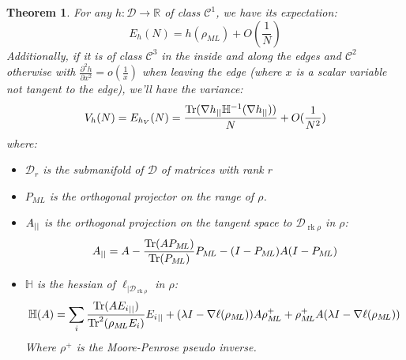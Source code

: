 \documentclass[10pt,a4paper]{report}
\theoremstyle{plain}
\newtheorem{thm}{Theorem}[chapter]
\theoremstyle{definition}
\theoremstyle{remark}
\newcommand{\R}{\ensuremath{\mathbb{R}}}
\newcommand{\dparn}[3]{\frac{\partial^{#3} {#1}}{\partial{#2}^{#3}}}
\DeclareMathOperator{\Tr}{Tr}
\DeclareMathOperator{\rk}{rk}
\newcommand{\class}[1]{{\mathscr{C}^{#1}}}
\newcommand{\ml}{_{M\!L}}
\begin{document}
\begin{thm}\label{thm:asymain}
  For any $h : \mathcal{D} \to \R$ of class $\class 1$,
  we have its expectation:
  \[E_h(N) = h(\rho\ml) + O\left(\frac 1N\right)\]
  Additionally, if it is of class $\class 3$ in the inside and along the edges
  and $\class 2$ otherwise with $\dparn h x 2 =
  o(\frac 1 x)$ when leaving the edge (where $x$ is a scalar variable not
  tangent to the
  edge), we'll have the variance:
  \[V_h(N) = E_{h_V}(N) = \frac{\Tr(\nabla h\pr \mathbb H\inv(\nabla h\pr))}N +O(\frac 1 {N^2})\]
  where:
\begin{itemize}
\item $\mathcal{D}_r$ is the submanifold of $\mathcal{D}$ of matrices with rank $r$
\item $P\ml$ is the orthogonal projector on the range of $\rho$.
\item $A_{||}$ is
  the orthogonal projection on the tangent space to $\mathcal{D}_{\rk \rho}$ in
  $\rho$:
  \[A\pr = A - \frac{\Tr(AP\ml)}{\Tr(P\ml)}P\ml - (I-P\ml)A(I-P\ml)\]
\item $\mathbb H$ is the hessian of $\ell_{|\mathcal{D}_{\rk \rho}}$ in $\rho$:
  \[\mathbb{H}(A) = \sum_i \frac{\Tr(A{E_i}\pr)}{\Tr^2(\rho\ml E_i)} {E_i}\pr +
    (\lambda I - \nabla \ell(\rho\ml))A\rho\ml^+ +
    \rho\ml^+A(\lambda I - \nabla \ell(\rho\ml))\]
  Where $\rho^+$ is the Moore-Penrose pseudo inverse.
\end{itemize}

\end{thm}
\end{document}
